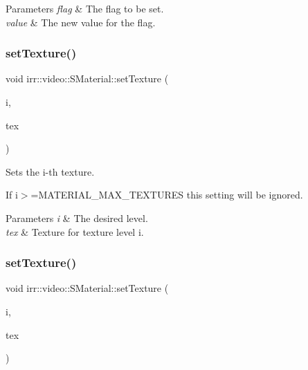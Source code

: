 \begin{DoxyParams}{Parameters}
{\em flag} & The flag to be set. \\
\hline
{\em value} & The new value for the flag. \\
\hline
\end{DoxyParams}
\mbox{\label{classirr_1_1video_1_1SMaterial_a44dc38e7d4a78434d12ffd02e88e3d60}} 
\subsubsection{\texorpdfstring{set\+Texture()}{setTexture()}\hspace{0.1cm}{\footnotesize\ttfamily [1/2]}}
{\footnotesize\ttfamily void irr\+::video\+::\+S\+Material\+::set\+Texture (\begin{DoxyParamCaption}\item[{\hyperlink{namespaceirr_a0416a53257075833e7002efd0a18e804}{u32}}]{i,  }\item[{\hyperlink{classirr_1_1video_1_1ITexture}{I\+Texture} $\ast$}]{tex }\end{DoxyParamCaption})\hspace{0.3cm}{\ttfamily [inline]}}



Sets the i-\/th texture. 

If i$>$=M\+A\+T\+E\+R\+I\+A\+L\+\_\+\+M\+A\+X\+\_\+\+T\+E\+X\+T\+U\+R\+ES this setting will be ignored. 
\begin{DoxyParams}{Parameters}
{\em i} & The desired level. \\
\hline
{\em tex} & Texture for texture level i. \\
\hline
\end{DoxyParams}
\mbox{\label{classirr_1_1video_1_1SMaterial_a44dc38e7d4a78434d12ffd02e88e3d60}} 
\subsubsection{\texorpdfstring{set\+Texture()}{setTexture()}\hspace{0.1cm}{\footnotesize\ttfamily [2/2]}}
{\footnotesize\ttfamily void irr\+::video\+::\+S\+Material\+::set\+Texture (\begin{DoxyParamCaption}\item[{\hyperlink{namespaceirr_a0416a53257075833e7002efd0a18e804}{u32}}]{i,  }\item[{\hyperlink{classirr_1_1video_1_1ITexture}{I\+Texture} $\ast$}]{tex }\end{DoxyParamCaption})\hspace{0.3cm}{\ttfamily [inline]}}



